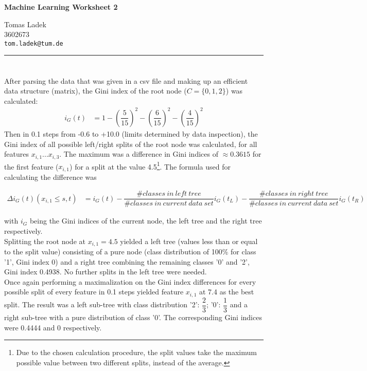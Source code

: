 \documentclass[11pt]{article}
\makeatletter
\newcommand{\exercise}{\section{}}
\newcommand{\hwhead}[4]{
\begin{center}
\sffamily\large\bfseries Machine Learning Worksheet #1
\vspace{2mm}
\normalfont

#2\\
#3\\
\texttt{#4}
\end{center}
\vspace{6mm} \hrule \vspace{4mm}
}
\newcommand{\names}{Tomas Ladek} %
\newcommand{\imats}{3602673} %
\newcommand{\emails}{tom.ladek@tum.de} %
\makeatother
\begin{document}
\hwhead{2}{\names}{\imats}{\emails}


\exercise
After parsing the data that was given in a csv file and making up an efficient data structure (matrix), the Gini index of the root node ($C = \{0, 1, 2\}$) was calculated:
\begin{align*}
	i_G(t) &= 1 - (\dfrac{5}{15})^2 - (\dfrac{6}{15})^2 - (\dfrac{4}{15})^2
\end{align*}
Then in 0.1 steps from -0.6 to +10.0 (limits determined by data inspection), the Gini index of all possible left/right splits of the root node was calculated, for all features $x_{i,1}...x_{i,3}$. The maximum was a difference in Gini indices of $\approx0.3615$ for the first feature ($x_{i,1}$) for a split at the value 4.5\footnote{Due to the chosen calculation procedure, the split values take the maximum possible value between two different splits, instead of the average.}. The formula used for calculating the difference was

\begin{align*}
	\Delta i_G(t) (x_{i,1} \le s, t) &= i_G(t) - \dfrac{ \#classes\ in\ left\ tree}{\#classes\ in\ current\ data\ set}i_G(t_L) - \dfrac{ \#classes\ in\ right\ tree}{\#classes\ in\ current\ data\ set}i_G(t_R)
\end{align*}

with $i_G$ being the Gini indices of the current node, the left tree and the right tree respectively.\\

Splitting the root node at $x_{i,1} = 4.5$ yielded a left tree (values less than or equal to the split value) consisting of a pure node (class distribution of 100\% for class '1', Gini index 0) and a right tree combining the remaining classes '0' and '2', Gini index 0.4938. No further splits in the left tree were needed.\\

 Once again performing a maximalization on the Gini index differences for every possible split of every feature in 0.1 steps yielded feature $x_{i,1}$ at 7.4 as the best split. The result was a left sub-tree with class distribution '2': $\dfrac{2}{3}$; '0': $\dfrac{1}{3}$ and a right sub-tree with a pure distribution of class '0'. The corresponding Gini indices were 0.4444 and 0 respectively.\\
 
\end{document}
